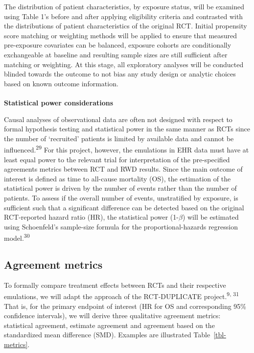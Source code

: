 \documentclass[
  letterpaper,
  DIV=11,
  numbers=noendperiod]{scrartcl}
\makeatletter
\let\oldparagraph\paragraph
\renewcommand{\paragraph}{
    \@ifstar
      \xxxParagraphStar
      \xxxParagraphNoStar
  }
\newcommand{\xxxParagraphStar}[1]{\oldparagraph*{#1}\mbox{}}
\newcommand{\xxxParagraphNoStar}[1]{\oldparagraph{#1}\mbox{}}
\makeatother
\begin{document}
The distribution of patient characteristics, by exposure status, will be
examined using Table 1's before and after applying eligibility criteria
and contrasted with the distributions of patient characteristics of the
original RCT. Initial propensity score matching or weighting methods
will be applied to ensure that measured pre-exposure covariates can be
balanced, exposure cohorts are conditionally exchangeable at baseline
and resulting sample sizes are still sufficient after matching or
weighting. At this stage, all exploratory analyses will be conducted
blinded towards the outcome to not bias any study design or analytic
choices based on known outcome information.

\paragraph{\texorpdfstring{\textbf{Statistical power
considerations}}{Statistical power considerations}}\label{statistical-power-considerations}

Causal analyses of observational data are often not designed with
respect to formal hypothesis testing and statistical power in the same
manner as RCTs since the number of `recruited' patients is limited by
available data and cannot be influenced.\textsuperscript{29} For this
project, however, the emulations in EHR data must have at least equal
power to the relevant trial for interpretation of the pre-specified
agreements metrics between RCT and RWD results. Since the main outcome
of interest is defined as time to all-cause mortality (OS), the
estimation of the statistical power is driven by the number of events
rather than the number of patients. To assess if the overall number of
events, unstratified by exposure, is sufficient such that a significant
difference can be detected based on the original RCT-reported hazard
ratio (HR), the statistical power (1-\(\beta\)) will be estimated using
Schoenfeld's sample-size formula for the proportional-hazards regression
model.\textsuperscript{30}

\subsection{Agreement metrics}\label{sec-agreement-metrics}

To formally compare treatment effects between RCTs and their respective
emulations, we will adapt the approach of the RCT-DUPLICATE
project.\textsuperscript{9, 31} That is, for the primary endpoint of
interest (HR for OS and corresponding 95\% confidence intervals), we
will derive three qualitative agreement metrics: statistical agreement,
estimate agreement and agreement based on the standardized mean
difference (SMD). Examples are illustrated Table~\ref{tbl-metrics}.
\end{document}
